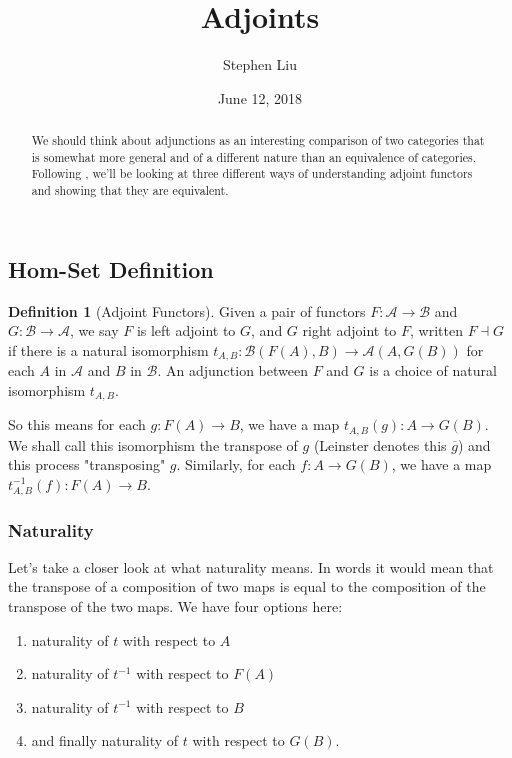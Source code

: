 \documentclass[11pt]{article}
\theoremstyle{definition}
\newtheorem*{defn}{Definition}
\theoremstyle{definition}
\theoremstyle{plain}
\theoremstyle{plain}
\theoremstyle{plain}
\begin{document}
\author{Stephen Liu}
\title{Adjoints}
\date{June 12, 2018}

\maketitle

\begin{abstract}
We should think about adjunctions as an interesting comparison of two categories that is somewhat more general and of a different nature than an equivalence of categories. Following \cite{leinster_basic_2014}, we'll be looking at three different ways of understanding adjoint functors and showing that they are equivalent.
\end{abstract}

\subsection*{Hom-Set Definition}
\begin{defn}[Adjoint Functors]
Given a pair of functors $F:\mathscr{A}\to\mathscr{B}$ and $G:\mathscr{B}\to\mathscr{A}$, we say $F$ is left adjoint to $G$, and $G$ right adjoint to $F$, written $F \dashv G$ if there is a natural isomorphism $t_{A,B}:\mathscr{B}(F(A),B) \to \mathscr{A}(A,G(B))$ for each $A$ in $\mathscr{A}$ and $B$ in $\mathscr{B}$. An adjunction between $F$ and $G$ is a choice of natural isomorphism $t_{A,B}$.
\end{defn}

So this means for each $g:F(A) \to B$, we have a map $t_{A,B}(g): A \to G(B)$. We shall call this isomorphism the transpose of $g$ (Leinster denotes this $\overline{g}$) and this process "transposing" $g$. Similarly, for each $f: A \to G(B)$, we have a map $t^{-1}_{A,B}(f): F(A) \to B$.

\subsubsection*{Naturality}
Let's take a closer look at what naturality means. In words it would mean that the transpose of a composition of two maps is equal to the composition of the transpose of the two maps. We have four options here: 
\begin{enumerate}
\item naturality of $t$ with respect to $A$
\item naturality of $t^{-1}$ with respect to $F(A)$
\item naturality of $t^{-1}$ with respect to $B$
\item and finally naturality of $t$ with respect to $G(B)$.
\end{enumerate}
\end{document}
